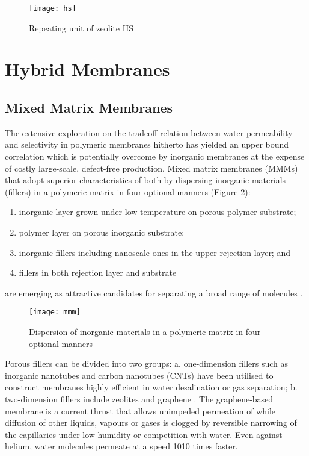 \documentclass[a4paper,12pt]{report}
\begin{document}
\begin{figure}[h!]
\centering
  \texttt{[image: hs]}
  \caption{Repeating unit of zeolite HS}
  \label{hs}
\end{figure}


\section{Hybrid Membranes}

\subsection{Mixed Matrix Membranes}

The extensive exploration on the tradeoff relation between water permeability and selectivity in polymeric membranes hitherto has yielded an upper bound correlation  \citep{68gei, 681rob} which is potentially overcome by inorganic membranes at the expense of costly large-scale, defect-free production. Mixed matrix membranes (MMMs) that adopt superior characteristics of both by dispersing inorganic materials (fillers) in a polymeric matrix in four optional manners (Figure \ref{mmm}): 
\begin{enumerate}
\item inorganic layer grown under low-temperature on porous polymer substrate; 
\item polymer layer on porous inorganic substrate; 
\item inorganic fillers including nanoscale ones in the upper rejection layer; and
\item fillers in both rejection layer and substrate 
\end{enumerate}
are emerging as attractive candidates for separating a broad range of molecules \citep{72kim}. 

\begin{figure}[h!]
\centering
  \texttt{[image: mmm]}
  \caption{Dispersion of inorganic materials in a polymeric matrix in four optional manners}
  \label{mmm}
\end{figure}

Porous fillers can be divided into two groups: a. one-dimension fillers such as inorganic nanotubes \citep{70zang} and carbon nanotubes (CNTs) \citep{67achan, 69cong} have been utilised to construct membranes highly efficient in water desalination or gas separation; b. two-dimension fillers include zeolites \citep{30apen} and graphene \citep{71nair}. The graphene-based membrane is a current thrust that allows unimpeded permeation of  while diffusion of other liquids, vapours or gases is clogged by reversible narrowing of the capillaries under low humidity or competition with water. Even against helium, water molecules permeate at a speed 1010 times faster.
\end{document}
